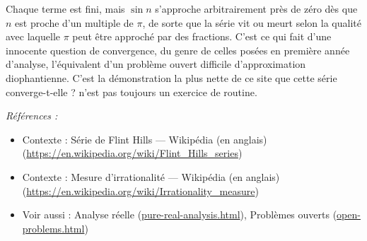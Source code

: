 \documentclass[11pt]{article}
\newenvironment{refs}{\par\small\noindent\emph{Références :}\begin{itemize}\setlength\itemsep{0pt}}{\end{itemize}\normalsize}
\begin{document}
\noindent Chaque terme est fini, mais $ \sin n $ s'approche arbitrairement près de zéro
dès que $ n $ est proche d'un multiple de $ \pi $, de sorte que la série vit ou meurt selon la qualité avec
laquelle $ \pi $ peut être approché par des fractions. C'est ce qui fait d'une innocente
question de convergence, du genre de celles posées en première année d'analyse, l'équivalent d'un problème ouvert
difficile d'approximation diophantienne. C'est la démonstration la plus nette de ce site que
\og{} cette série converge-t-elle ? \fg{} n'est pas toujours un exercice de routine.

\begin{refs}
\item Contexte : Série de Flint Hills --- Wikipédia (en anglais) (\url{https://en.wikipedia.org/wiki/Flint_Hills_series})
\item Contexte : Mesure d'irrationalité --- Wikipédia (en anglais) (\url{https://en.wikipedia.org/wiki/Irrationality_measure})
\item Voir aussi : Analyse réelle (\url{pure-real-analysis.html}), Problèmes ouverts (\url{open-problems.html})
\end{refs}

\bigskip
\end{document}
